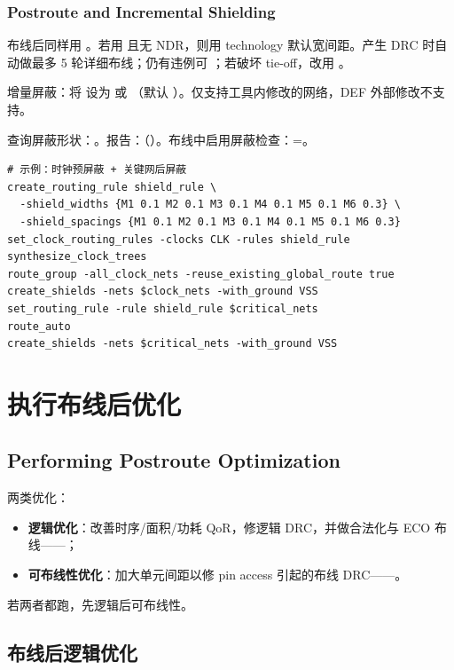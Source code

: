 \subsubsection*{Postroute and Incremental Shielding}

布线后同样用 。若用  且无 NDR，则用 technology 默认宽间距。产生 DRC 时自动做最多 5 轮详细布线；仍有违例可 ；若破坏 tie-off，改用 。

增量屏蔽：将  设为  或 （默认 ）。仅支持工具内修改的网络，DEF 外部修改不支持。

查询屏蔽形状：。报告：（）。布线中启用屏蔽检查：=。

\begin{lstlisting}
# 示例：时钟预屏蔽 + 关键网后屏蔽
create_routing_rule shield_rule \
  -shield_widths {M1 0.1 M2 0.1 M3 0.1 M4 0.1 M5 0.1 M6 0.3} \
  -shield_spacings {M1 0.1 M2 0.1 M3 0.1 M4 0.1 M5 0.1 M6 0.3}
set_clock_routing_rules -clocks CLK -rules shield_rule
synthesize_clock_trees
route_group -all_clock_nets -reuse_existing_global_route true
create_shields -nets $clock_nets -with_ground VSS
set_routing_rule -rule shield_rule $critical_nets
route_auto
create_shields -nets $critical_nets -with_ground VSS
\end{lstlisting}

\section{执行布线后优化}
\subsection*{Performing Postroute Optimization}

两类优化：
\begin{itemize}
  \item \textbf{逻辑优化}：改善时序/面积/功耗 QoR，修逻辑 DRC，并做合法化与 ECO 布线——；
  \item \textbf{可布线性优化}：加大单元间距以修 pin access 引起的布线 DRC——。
\end{itemize}
若两者都跑，先逻辑后可布线性。

\subsection{布线后逻辑优化}
